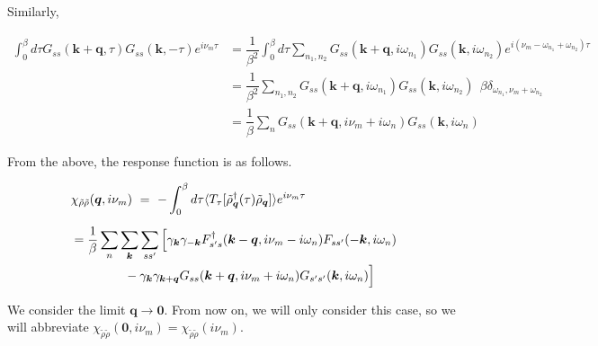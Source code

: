 \documentclass[a4j]{jsarticle}
\begin{document}
Similarly,

\begin{align}
	\int^{\beta}_{0} d \tau
	G_{ s s } ( \bm{k} + \bm{q} , \tau )
	G_{ s s } ( \bm{k} , - \tau )
	e^{i \nu_{m} \tau}
	&=
	\dfrac{1}{\beta^{2}}
	\int^{\beta}_{0} d \tau
	\sum_{n_{1},n_{2}}
	G_{ s s } ( \bm{k} + \bm{q} , i \omega_{n_{1}} )
	G_{ s s } ( \bm{k} , i \omega_{n_{2}} )
	e^{i ( \nu_{m} - \omega_{n_{1}} + \omega_{n_{2}} ) \tau }
	\nonumber \\[2mm] &=
	\dfrac{ 1 }{\beta^{2}} \sum_{n_{1},n_{2}}
	G_{ s s } ( \bm{k} + \bm{q} , i \omega_{n_{1}} )
	G_{ s s } ( \bm{k} , i \omega_{n_{2}} )
	\ \ \beta
	\delta_{ \omega_{n_{1}} , \nu_{m} + \omega_{n_{2}} }
	\nonumber \\[2mm] &=
	\dfrac{ 1 }{\beta} \sum_{n}
	G_{ s s } ( \bm{k} + \bm{q} , i \nu_{m} + i \omega_{n} )
	G_{ s s } ( \bm{k} , i \omega_{n} )
\end{align}

From the above, the response function is as follows.

\begin{align}
	&
	\chi_{\tilde{\rho} \tilde{\rho}}(\bm{q},i \nu_{m})
	\ = \
	-
	\int^{\beta}_{0} d \tau
	\langle T_{\tau}[ \tilde{\rho}_{\bm{q}}^{\dagger} (\tau) \tilde{\rho}_{\bm{q}} ] \rangle
	e^{i \nu_{m} \tau}
	\nonumber \\[2mm]
	&=
	\dfrac{1}{\beta}
	\sum_{n}
	\sum_{ \bm{k} }
	\sum_{s s'}
	\Big[
		\gamma_{\bm{k}}
		\gamma_{-\bm{k}}
		F_{ s' s }^{\dagger}( \bm{k} - \bm{q} , i \nu_{m} - i \omega_{n} )
		F_{ s s' } ( - \bm{k} , i \omega_{n} )
	\nonumber \\ & \hspace{15mm} -
		\gamma_{\bm{k}}
		\gamma_{\bm{k}+\bm{q}}
		G_{ s s } ( \bm{k} + \bm{q} , i \nu_{m} + i \omega_{n} )
		G_{ s' s' } ( \bm{k} , i \omega_{n} )
	\Big]
\end{align}

We consider the limit $\bm{q} \to \bm{0}$.
From now on, we will only consider this case, so we will abbreviate $\chi_{\tilde{\rho} \tilde{\rho}}(\bm{0},i \nu_{m}) = \chi_{\tilde{\rho} \tilde{\rho}}(i \nu_{m})$.
\end{document}
